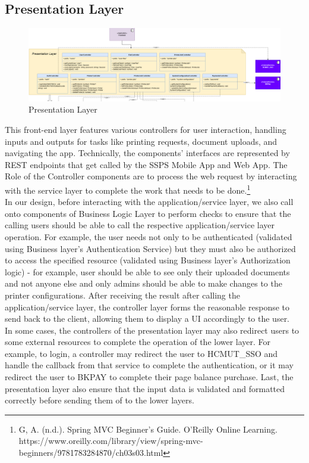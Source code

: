 \subsection{Presentation Layer}

\begin{figure}[H]
  \includegraphics[max width=0.9\linewidth]{chapters/6. architecture-design/Layered Architecture/1. Presentation Layer.png}
  \caption{Presentation Layer}%
\end{figure}

This front-end layer features various controllers for user interaction, handling inputs and outputs for tasks like printing requests, document uploads, and navigating the app. Technically, the components’ interfaces are represented by REST endpoints that get called by the SSPS Mobile App and Web App. The Role of the Controller components are to process the web request by interacting with the service layer to complete the work that needs to be done.\footnote{G, A. (n.d.). Spring MVC Beginner’s Guide. O’Reilly Online Learning. https://www.oreilly.com/library/view/spring-mvc-beginners/9781783284870/ch03s03.html}\\

In our design, before interacting with the application/service layer, we also call onto components of Business Logic Layer to perform checks to ensure that the calling users should be able to call the respective application/service layer operation. For example, the user needs not only to be authenticated (validated using Business layer’s Authentication Service) but they must also be authorized to access the specified resource (validated using Business layer’s Authorization logic) - for example, user should be able to see only their uploaded documents and not anyone else and only admins should be able to make changes to the printer configurations. After receiving the result after calling the application/service layer, the controller layer forms the reasonable response to send back to the client, allowing them to display a UI accordingly to the user.\\

In some cases, the controllers of the presentation layer may also redirect users to some external resources to complete the operation of the lower layer. For example, to login, a controller may redirect the user to HCMUT\_SSO and handle the callback from that service to complete the authentication, or it may redirect the user to BKPAY to complete their page balance purchase. Last, the presentation layer also ensure that the input data is validated and formatted correctly before sending them of to the lower layers.


